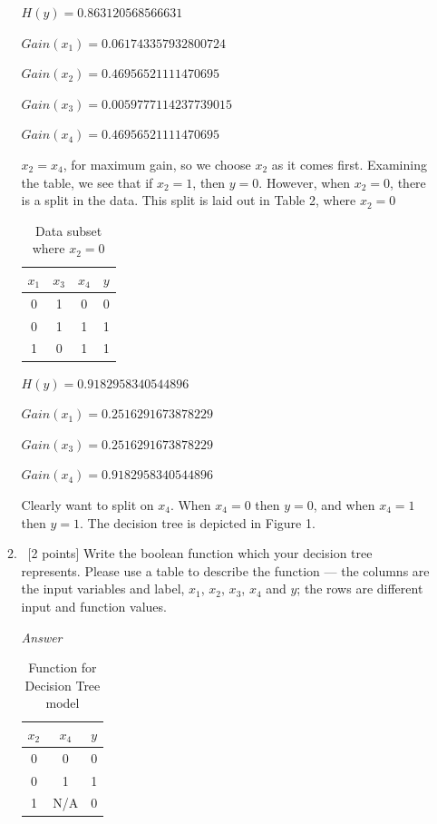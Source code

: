 \documentclass[12pt, fullpage,letterpaper]{article}
\begin{document}
\begin{enumerate}
\begin{enumerate}
\vspace{5mm}

$H(y)=0.863120568566631$

$Gain(x_1)=0.061743357932800724$

$Gain(x_2)=0.46956521111470695$

$Gain(x_3)=0.0059777114237739015$

$Gain(x_4)=0.46956521111470695$

\vspace{5mm}

$x_2=x_4$, for maximum gain, so we choose $x_2$ as it comes first. Examining the table, we see that if $x_2=1$, then $y=0$. However, when $x_2=0$, there is a split in the data. This split is laid out in Table 2, where $x_2=0$

\begin{table}[h]
	\centering
	\begin{tabular}{ccc|c}
		$x_1$ & $x_3$ & $x_4$ & $y$\\ 
		\hline\hline
		0 & 1 & 0 & 0 \\ \hline
		0 & 1 & 1 & 1 \\ \hline
		1 & 0 & 1 & 1 \\ \hline
	\end{tabular}
	\caption{Data subset where $x_2=0$}
\end{table}

$H(y)=0.9182958340544896$

$Gain(x_1)=0.2516291673878229$

$Gain(x_3)=0.2516291673878229$

$Gain(x_4)=0.9182958340544896$

\vspace{5mm}

Clearly want to split on $x_4$. When $x_4=0$ then $y=0$, and when $x_4=1$ then $y=1$. The decision tree is depicted in Figure 1.

\item~[2 points] Write the boolean function which your decision tree represents. Please use a table to describe the function --- the columns are the input variables and label, \ie $x_1$, $x_2$, $x_3$, $x_4$ and $y$; the rows are different input and  function values. 

\emph{Answer}

\begin{table}[h]
	\centering
	\begin{tabular}{cc|c}
		$x_2$ & $x_4$ & $y$\\ 
		\hline\hline
		0 & 0 & 0 \\ \hline
		0 & 1 & 1 \\ \hline
		1 & N/A & 0 \\ \hline
	\end{tabular}
	\caption{Function for Decision Tree model}
\end{table}


\end{enumerate}
\end{enumerate}
\end{document}
